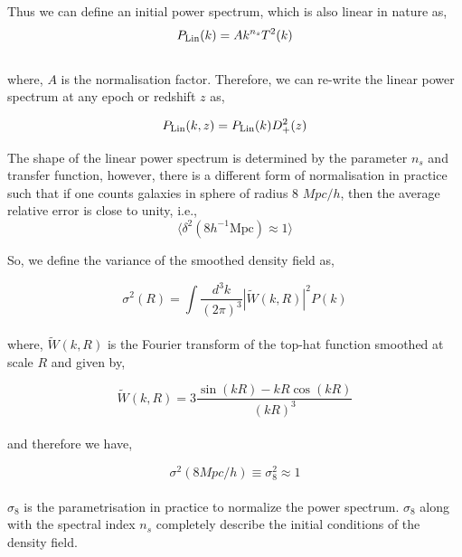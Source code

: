 Thus we can define an initial power spectrum, which is also linear in nature as,
\begin{equation}
	P_{\rm Lin}(k) = A k^{n_s} T^2(k)
\end{equation}
\\
where, $A$ is the normalisation factor. Therefore, we can re-write the linear
power spectrum at any epoch or redshift $z$ as,

\begin{equation}
	P_{\rm Lin}(k,z) = P_{\rm Lin}(k) D^2_+(z)
\end{equation}

The shape of the linear power spectrum is determined by the parameter $n_s$ and 
transfer function, however, there is a different form of normalisation in 
practice such that if one counts galaxies in sphere of radius 8 $Mpc/h$, then
the average relative error is close to unity, i.e.,
\begin{equation}
	\langle \delta^2(8 h^{-1} \mathrm{Mpc}) \approx 1 \rangle
\end{equation}

So, we define the variance of the smoothed density field as,

\begin{equation}
	\sigma^2(R) = \int \dfrac{d^3k}{(2\pi)^3} |\tilde{W}(k,R)|^2 P(k)
\end{equation}
\\
where, $\tilde{W}(k,R)$ is the Fourier transform of the top-hat function smoothed 
at scale $R$ and given by,

\begin{equation}
	\tilde{W}(k,R) = 3\dfrac{\sin(kR) - kR \cos(kR)}{(kR)^3}
\end{equation}
\\
and therefore we have,

\begin{equation}
	\sigma^2(8 Mpc/h) \equiv \sigma_8^2 \approx 1
\end{equation}
\\
$\sigma_8$ is the parametrisation in practice to normalize the power
spectrum. $\sigma_8$ along with the spectral index $n_s$ completely
describe the initial conditions of the density field.

